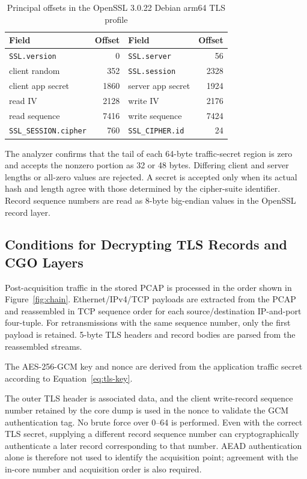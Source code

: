\documentclass[10pt,a4paper]{article}
\newcommand{\code}[1]{\nolinkurl{#1}}
\begin{document}
\begin{table}[!tbp]
\centering
\caption{Principal offsets in the OpenSSL 3.0.22 Debian arm64 TLS profile}
\label{tab:tls-profile}
\small
\begin{tabular}{lr@{\qquad}lr}
\toprule
Field & Offset & Field & Offset \\
\midrule
\code{SSL.version} & 0 & \code{SSL.server} & 56 \\
client random & 352 & \code{SSL.session} & 2328 \\
client app secret & 1860 & server app secret & 1924 \\
read IV & 2128 & write IV & 2176 \\
read sequence & 7416 & write sequence & 7424 \\
\code{SSL_SESSION.cipher} & 760 & \code{SSL_CIPHER.id} & 24 \\
\bottomrule
\end{tabular}
\end{table}

The analyzer confirms that the tail of each 64-byte traffic-secret region is zero and accepts the nonzero portion as 32 or 48 bytes. Differing client and server lengths or all-zero values are rejected. A secret is accepted only when its actual hash and length agree with those determined by the cipher-suite identifier. Record sequence numbers are read as 8-byte big-endian values in the OpenSSL record layer.

\subsection{Conditions for Decrypting TLS Records and CGO Layers}

Post-acquisition traffic in the stored PCAP is processed in the order shown in Figure~\ref{fig:chain}. Ethernet/IPv4/TCP payloads are extracted from the PCAP and reassembled in TCP sequence order for each source/destination IP-and-port four-tuple. For retransmissions with the same sequence number, only the first payload is retained. 5-byte TLS headers and record bodies are parsed from the reassembled streams.

The AES-256-GCM key and nonce are derived from the application traffic secret according to Equation~\eqref{eq:tls-key}.

The outer TLS header is associated data, and the client write-record sequence number retained by the core dump is used in the nonce to validate the GCM authentication tag. No brute force over 0--64 is performed. Even with the correct TLS secret, supplying a different record sequence number can cryptographically authenticate a later record corresponding to that number. AEAD authentication alone is therefore not used to identify the acquisition point; agreement with the in-core number and acquisition order is also required.
\end{document}
